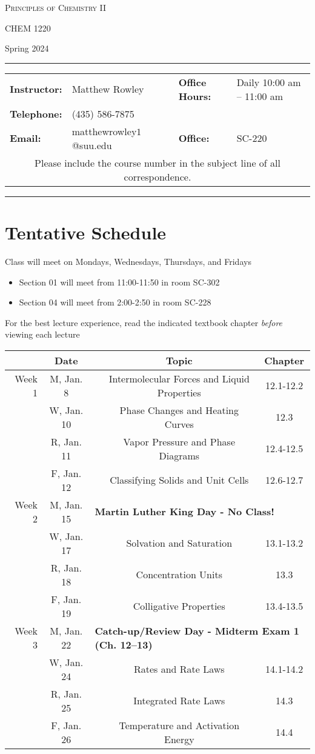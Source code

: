 \documentclass[12pt, letterpaper]{article}
\begin{document}
\begin{center}
	{\Large \textsc{Principles of Chemistry II}}
	
	CHEM 1220
\end{center}
\begin{center}
	{\large Spring 2024}
\end{center}
\begin{center}
	\rule{0.99\textwidth}{0.4pt}
	\begin{tabular}{llcll}
		\textbf{Instructor:} & Matthew Rowley & & \textbf{Office Hours:} & Daily 10:00 am -- 11:00 am \\
		\textbf{Telephone:} & (435) 586-7875 & & & \\
		\textbf{Email:} & matthewrowley$1$@suu.edu  & & \textbf{Office:} & SC-220\\
		\multicolumn{5}{c}{Please include the course number in the subject line of all correspondence.} 
	\end{tabular}
	\rule{0.99\textwidth}{0.4pt}
\end{center}

\section*{Tentative Schedule}
Class will meet on Mondays, Wednesdays, Thursdays, and Fridays
\begin{itemize}
  \item Section 01 will meet from 11:00-11:50 in room SC-302
  \item Section 04 will meet from 2:00-2:50 in room SC-228
\end{itemize}

\noindent For the best lecture experience, read the indicated textbook chapter \emph{before} viewing each lecture

\begin{tabular}{rcccc}
& Date && Topic & Chapter\\
\midrule
Week 1 & M, Jan. 8&& Intermolecular Forces and Liquid Properties & 12.1-12.2\\
& W, Jan. 10&& Phase Changes and Heating Curves & 12.3\\
& R, Jan. 11&& Vapor Pressure and Phase Diagrams & 12.4-12.5\\
& F, Jan. 12&& Classifying Solids and Unit Cells & 12.6-12.7\\
\midrule
Week 2 & M, Jan. 15& \multicolumn{3}{l}{\textbf{Martin Luther King Day - No Class!}}\\
& W, Jan. 17&& Solvation and Saturation & 13.1-13.2\\
& R, Jan. 18&& Concentration Units & 13.3\\
& F, Jan. 19&& Colligative Properties & 13.4-13.5\\
\midrule
Week 3 & M, Jan. 22& \multicolumn{3}{l}{\textbf{Catch-up/Review Day - Midterm Exam 1 (Ch. 12--13)}}\\
& W, Jan. 24&& Rates and Rate Laws & 14.1-14.2\\
& R, Jan. 25&& Integrated Rate Laws & 14.3\\
& F, Jan. 26&& Temperature and Activation Energy & 14.4\\
\end{tabular}
\end{document}
